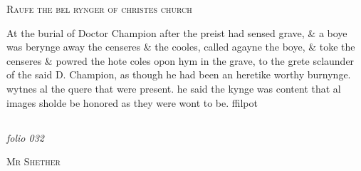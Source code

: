 \documentclass[12pt, a4paper]{book}
\begin{document}
            
            	
				\begin{center} \begin{large} {\scshape Raufe the bel rynger of christes church} \end{large} \end{center}
			


	
				\marginpar[\vspace{0.5cm}{\textcolor{Gray}{n}}]{}
			
	
				\marginpar[\vspace{0.5cm}{\textcolor{Gray}{Images}}]{}
			
	
		\ifthenelse{\isodd{\thepage}}
		{\reversemarginpar}
		{\normalmarginpar}
		At the burial of Doctor Champion after the preist had sensed
 grave, \& a boye was berynge away the censeres \& the cooles,
 called agayne the boye, \& toke the censeres \& powred the hote
 coles opon hym in the grave, to the grete sclaunder of the said
		D. Champion, as though he had been an heretike worthy
 burnynge. wytnes al the quere that were present.
 he said the kynge was content that al images sholde be honored as
 they were wont to be. ffilpot



            
\dotfill
					  \subsection*{}  \subsection*{}  \subsection*{}  \subsection*{}

\textit{folio 032}


            
            	
				\begin{center} \begin{large} {\scshape Mr Shether} \end{large} \end{center}
			
\end{document}
